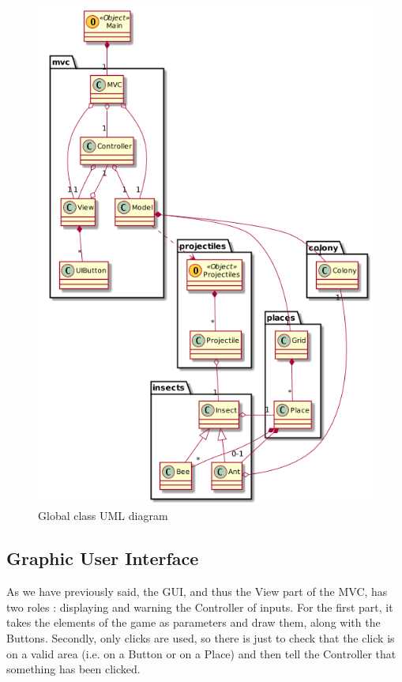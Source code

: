 \documentclass[
	a4paper
]{article}
\begin{document}
%
\begin{figure}[H]
	\includegraphics[scale=0.7]{classDiagram.png}
	\caption{Global class UML diagram}
	\label{classDiagram}
\end{figure}
%

	\subsection{Graphic User Interface}
	
	As we have previously said, the GUI, and thus the View part of the MVC, has two roles : %
displaying and warning the Controller of inputs. For the first part, it takes the elements of the game as parameters and draw them, along with the Buttons. %
Secondly, only clicks are used, so there is just to check that the click is on a valid area (i.e. on a Button or on a Place) and then tell the Controller that something has been clicked.
	
\end{document}
